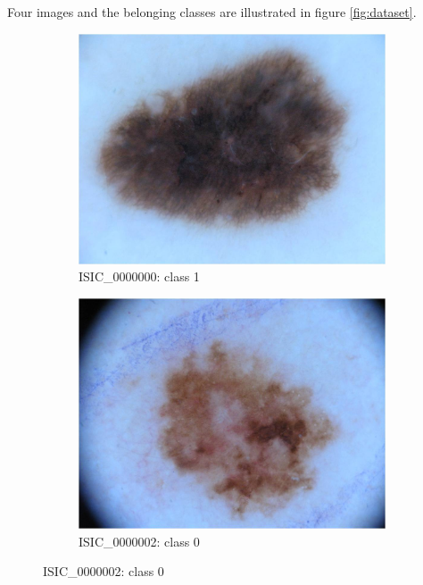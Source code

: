 Four images and the belonging classes are illustrated in figure \ref{fig:dataset}.
\begin{figure}
	\begin{subfigure}{.24\textwidth}
		\centering
		\includegraphics[width=.9\linewidth]{pictures/ISIC_0000000.jpg}  
		\caption{ISIC\_0000000: class 1}
		\label{fig:sub-first}
	\end{subfigure}
	\begin{subfigure}{.24\textwidth}
		\centering
		\includegraphics[width=.9\linewidth]{pictures/ISIC_0000002.jpg}  
		\caption{ISIC\_0000002: class 0}
		\label{fig:sub-second}
	\end{subfigure}
	

\end{figure}
